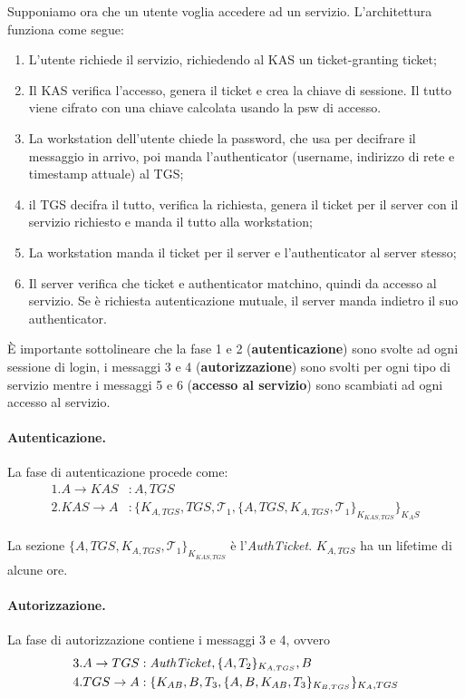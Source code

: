 \documentclass[a4paper, 10pt, twoside]{article}
\begin{document}
	Supponiamo ora che un utente voglia accedere ad un servizio. L'architettura funziona come segue: \begin{enumerate}
		\item L'utente richiede il servizio, richiedendo al KAS un ticket-granting ticket;
		\item Il KAS verifica l'accesso, genera il ticket e crea la chiave di sessione. Il tutto viene cifrato con una chiave calcolata usando la psw di accesso.
		\item La workstation dell'utente chiede la password, che usa per decifrare il messaggio in arrivo, poi manda l'authenticator (username, indirizzo di rete e timestamp attuale) al TGS;
		\item il TGS decifra il tutto, verifica la richiesta, genera il ticket per il server con il servizio richiesto e manda il tutto alla workstation;
		\item La workstation manda il ticket per il server e l'authenticator al server stesso;
		\item Il server verifica che ticket e authenticator matchino, quindi da accesso al servizio. Se è richiesta autenticazione mutuale, il server manda indietro il suo authenticator.
	\end{enumerate}

	È importante sottolineare che la fase 1 e 2 (\textbf{autenticazione}) sono svolte ad ogni sessione di login, i messaggi 3 e 4 (\textbf{autorizzazione}) sono svolti per ogni tipo di servizio mentre i messaggi 5 e 6 (\textbf{accesso al servizio}) sono scambiati ad ogni accesso al servizio.

	\paragraph{Autenticazione.} La fase di autenticazione procede come: \begin{align*}
		1.A \to KAS&: A, TGS \\
		2.KAS \to A&: \lbrace K_{A, TGS}, TGS, \mathcal{T}_1, \lbrace A, TGS, K_{A, TGS}, \mathcal{T}_1  \rbrace_{K_{KAS, TGS}}\rbrace_{K_AS}
	\end{align*}

	La sezione $\lbrace A, TGS, K_{A, TGS}, \mathcal{T}_1  \rbrace_{K_{KAS, TGS}}$ è l'\textit{AuthTicket}. $K_{A, TGS}$ ha un lifetime di alcune ore. 

	\paragraph{Autorizzazione.}
	La fase di autorizzazione contiene i messaggi 3 e 4, ovvero \begin{align*}
		3.A \to TGS&: \text{\textit{AuthTicket}}, \lbrace A, T_2\rbrace_{K_{A, TGS}}, B\\
		4.TGS \to A&:\lbrace K_{AB}, B, T_3, \lbrace A, B, K_{AB}, T_3\rbrace_{K_{B, TGS}} \rbrace_{K_A, TGS}
	\end{align*}
\end{document}

